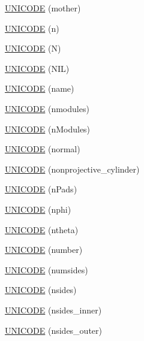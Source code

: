 \begin{DoxyCompactItemize}
\item 
\hyperlink{namespace_d_d4hep_1_1_x_m_l_a4c8903519e286213795023f3710c57a5}{U\+N\+I\+C\+O\+DE} (mother)
\item 
\hyperlink{namespace_d_d4hep_1_1_x_m_l_a3458a4001edb8639d60f56e9433ff533}{U\+N\+I\+C\+O\+DE} (n)
\item 
\hyperlink{namespace_d_d4hep_1_1_x_m_l_a39395e66100bbe3d31d68c6d9cabd9e7}{U\+N\+I\+C\+O\+DE} (N)
\item 
\hyperlink{namespace_d_d4hep_1_1_x_m_l_ad11ed89baa27e8b010b7b5ffc43fa7be}{U\+N\+I\+C\+O\+DE} (N\+IL)
\item 
\hyperlink{namespace_d_d4hep_1_1_x_m_l_ad5f515f8aede0de68a6c803b44c5fcbf}{U\+N\+I\+C\+O\+DE} (name)
\item 
\hyperlink{namespace_d_d4hep_1_1_x_m_l_aaaf759b178c00e1bb07c4aaaaa1b0c33}{U\+N\+I\+C\+O\+DE} (nmodules)
\item 
\hyperlink{namespace_d_d4hep_1_1_x_m_l_a491f8e607ec89dbfc461cf4cb468d506}{U\+N\+I\+C\+O\+DE} (n\+Modules)
\item 
\hyperlink{namespace_d_d4hep_1_1_x_m_l_a1001c7931f28d25f8c5e9028d57d7947}{U\+N\+I\+C\+O\+DE} (normal)
\item 
\hyperlink{namespace_d_d4hep_1_1_x_m_l_aafb4b59f013f6ec65c2d6245c1a27eb6}{U\+N\+I\+C\+O\+DE} (nonprojective\+\_\+cylinder)
\item 
\hyperlink{namespace_d_d4hep_1_1_x_m_l_a1dc4956b679a83bac03a0ce23e65652d}{U\+N\+I\+C\+O\+DE} (n\+Pads)
\item 
\hyperlink{namespace_d_d4hep_1_1_x_m_l_ab95167cdaa5e343a440636b77d02768d}{U\+N\+I\+C\+O\+DE} (nphi)
\item 
\hyperlink{namespace_d_d4hep_1_1_x_m_l_ab79f1b31012180a9fc1c35731915b35a}{U\+N\+I\+C\+O\+DE} (ntheta)
\item 
\hyperlink{namespace_d_d4hep_1_1_x_m_l_ad0b76e024c44947a4c3d0e9fcc9aa9c5}{U\+N\+I\+C\+O\+DE} (number)
\item 
\hyperlink{namespace_d_d4hep_1_1_x_m_l_a20f83649d0983872196ab2475768bbd4}{U\+N\+I\+C\+O\+DE} (numsides)
\item 
\hyperlink{namespace_d_d4hep_1_1_x_m_l_a60c34fa10c725e4ea4347368491dd580}{U\+N\+I\+C\+O\+DE} (nsides)
\item 
\hyperlink{namespace_d_d4hep_1_1_x_m_l_acab9f079b53b9049aaca67f8f12676c8}{U\+N\+I\+C\+O\+DE} (nsides\+\_\+inner)
\item 
\hyperlink{namespace_d_d4hep_1_1_x_m_l_afe56da53a380b4c3d1581c8cad42c1e8}{U\+N\+I\+C\+O\+DE} (nsides\+\_\+outer)
\item 

\end{DoxyCompactItemize}
